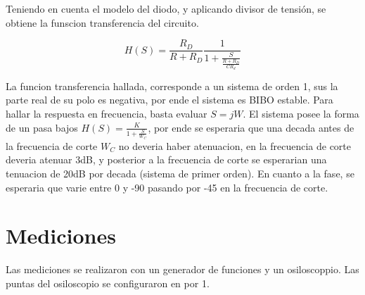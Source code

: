 \documentclass[../../e1_tp1_main.tex]{subfiles}
\begin{document}
Teniendo en cuenta el modelo del diodo, y aplicando divisor de tensión, se obtiene la funscion transferencia del circuito.

\begin{equation}
H(S)=\frac{R_D}{R + R_D} \frac{1}{1+ \frac{S}{\frac{R+R_D}{C R_d}}}
\end{equation}

La funcion transferencia hallada, corresponde a un sistema de orden 1, sus la parte real de su polo es negativa, por ende el sistema es BIBO estable. Para hallar la respuesta en frecuencia, basta evaluar $S=jW$. El sistema posee la forma de un pasa bajos $H(S)=\frac{K}{1+\frac{S}{W_C}}$,  por ende se esperaria que una decada antes de la frecuencia de corte $W_C$ no deveria haber atenuacion, en la frecuencia de corte deveria atenuar 3dB, y posterior a la frecuencia de corte se esperarian una tenuacion de 20dB por decada (sistema de primer orden). En cuanto a la fase, se esperaria que varie entre 0  y -90 pasando por -45 en la frecuencia de corte.

\section{Mediciones}

Las mediciones se realizaron con un generador de funciones y un osiloscoppio. Las puntas del osiloscopio se configuraron en por 1.
\end{document}
